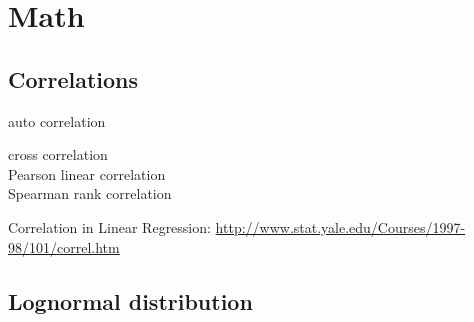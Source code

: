 \chapter{Math}
\label{chap:math}



\section{Correlations}
\label{sec:correlations}

auto correlation

cross correlation\\
Pearson linear correlation\\
Spearman rank correlation

Correlation in Linear Regression: \url{http://www.stat.yale.edu/Courses/1997-98/101/correl.htm}\\


\section{Lognormal distribution}
\label{sec:lognormal_distribution}

